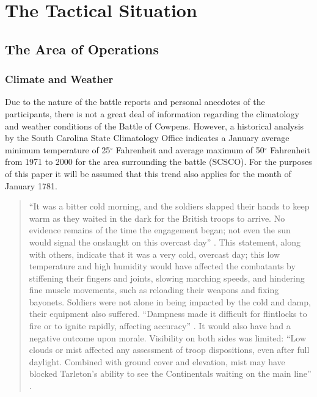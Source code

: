 \section{The Tactical Situation}


\subsection{The Area of Operations}

\subsubsection{Climate and Weather}

Due to the nature of the battle reports and personal anecdotes of the
participants, there is not a great deal of information regarding the climatology
and weather conditions of the Battle of Cowpens.  However, a historical analysis
by the South Carolina State Climatology Office indicates a January average
minimum temperature of 25$^\circ$ Fahrenheit and average maximum of 50$^\circ$ Fahrenheit from
1971 to 2000 for the area surrounding the battle (SCSCO).  For the purposes of
this paper it will be assumed that this trend also applies for the month of
January 1781.

\begin{quote}
``It was a bitter cold morning, and the soldiers slapped their hands to keep warm
as they waited in the dark for the British troops to arrive.  No evidence
remains of the time the engagement began; not even the sun would signal the
onslaught on this overcast day'' \cite[51]{moncure_cowpens_1996}.  This statement, along with
others, indicate that it was a very cold, overcast day; this low  temperature
and high humidity would have affected the combatants by stiffening their fingers
and joints, slowing marching speeds, and hindering fine muscle movements, such
as reloading their weapons and fixing bayonets. Soldiers were not alone in being
impacted by the cold and damp, their equipment also suffered.  ``Dampness made it
difficult for flintlocks to fire or to ignite rapidly, affecting accuracy'' \cite[79]{babits_devil_2001}.
It would also have had a negative outcome upon morale. 
Visibility on both sides was limited: ``Low clouds or mist affected any
assessment of troop dispositions, even after full daylight.  Combined with
ground cover and elevation, mist may have blocked Tarleton's ability to see the
Continentals waiting on the main line'' \cite[80]{babits_devil_2001}.
\end{quote}

